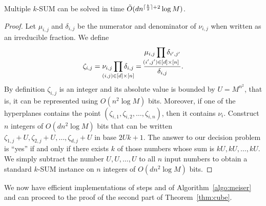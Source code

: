 \begin{lemma}\label{lem:multiple}
	Multiple $k$-SUM can be solved in time $\tilde{O}(dn^{{\lceil\frac{k}{2} \rceil}+2}\log M)$.
\end{lemma}
\begin{proof}
	Let $\mu_{i,j}$ and $\delta_{i,j}$ be the numerator and denominator of
	$\nu_{i,j}$ when written as an irreducible fraction. We define
	$$
		\zeta_{i,j} = \nu_{i,j}\prod_{\mathclap{(i,j) \in [d]\times[n]}} \delta_{i,j} =
		\frac{\mu_{i,j}\displaystyle\prod_{\mathclap{(i',j') \in [d]\times[n]}} \delta_{i',j'}}{\delta_{i,j}}.
	$$
	By definition $\zeta_{i,j}$ is an integer and its absolute value is bounded
	by $U = M^{n^2}$, that is, it can be
	represented using $O(n^2 \log M)$ bits. Moreover, if one of the hyperplanes
	contains the point $(\zeta_{i,1},\zeta_{i,2},\ldots,\zeta_{i,n})$, then it
	contains $\nu_i$. Construct $n$ integers of $O(dn^2 \log M)$ bits that can
	be written $\zeta_{1,j}+U,\zeta_{2,j}+U,\ldots,\zeta_{d,j}+U$ in base
	$2Uk+1$. The answer to our decision problem is ``yes'' if and only if there
	exists $k$ of those numbers whose sum is $kU,kU,\ldots,kU$. We simply
	subtract the number $U,U,\ldots,U$ to all $n$
	input numbers to obtain a standard $k$-SUM instance on $n$ integers of
	$O(dn^2 \log M)$ bits.
\end{proof}

We now have efficient implementations of steps  and 
of Algorithm~\ref{algo:meiser} and can proceed to the proof of the second part
of Theorem~\ref{thm:cube}.


